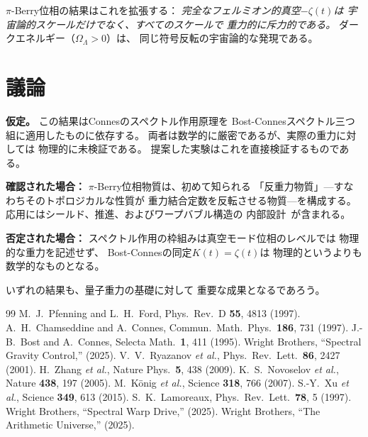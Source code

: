 \documentclass[11pt,a4paper,twocolumn]{article}
\begin{document}
$\pi$-Berry位相の結果はこれを拡張する：
\emph{完全なフェルミオン的真空$-\zeta(t)$は
宇宙論的スケールだけでなく、すべてのスケールで
重力的に斥力的である。}
ダークエネルギー（$\Omega_\Lambda > 0$）は、
同じ符号反転の宇宙論的な発現である。

\section{議論}

\textbf{仮定。}
この結果はConnesのスペクトル作用原理を
Bost-Connesスペクトル三つ組に適用したものに依存する。
両者は数学的に厳密であるが、実際の重力に対しては
物理的に未検証である。
提案した実験はこれを直接検証するものである。

\textbf{確認された場合：}
$\pi$-Berry位相物質は、初めて知られる
「反重力物質」---すなわちそのトポロジカルな性質が
重力結合定数を反転させる物質---を構成する。
応用にはシールド、推進、およびワープバブル構造の
内部設計~\cite{WB_spectral_warp}が含まれる。

\textbf{否定された場合：}
スペクトル作用の枠組みは真空モード位相のレベルでは
物理的な重力を記述せず、
Bost-Connesの同定$K(t) = \zeta(t)$は
物理的というよりも数学的なものとなる。

いずれの結果も、量子重力の基礎に対して
重要な成果となるであろう。

\begin{thebibliography}{99}
 M.~J.~Pfenning and L.~H.~Ford, Phys.\ Rev.\ D \textbf{55}, 4813 (1997).
 A.~H.~Chamseddine and A.~Connes, Commun.\ Math.\ Phys.\ \textbf{186}, 731 (1997).
 J.-B.~Bost and A.~Connes, Selecta Math.\ \textbf{1}, 411 (1995).
 Wright Brothers, ``Spectral Gravity Control,'' (2025).
 V.~V.~Ryazanov \textit{et al.}, Phys.\ Rev.\ Lett.\ \textbf{86}, 2427 (2001).
 H.~Zhang \textit{et al.}, Nature Phys.\ \textbf{5}, 438 (2009).
 K.~S.~Novoselov \textit{et al.}, Nature \textbf{438}, 197 (2005).
 M.~K\"onig \textit{et al.}, Science \textbf{318}, 766 (2007).
 S.-Y.~Xu \textit{et al.}, Science \textbf{349}, 613 (2015).
 S.~K.~Lamoreaux, Phys.\ Rev.\ Lett.\ \textbf{78}, 5 (1997).
 Wright Brothers, ``Spectral Warp Drive,'' (2025).
 Wright Brothers, ``The Arithmetic Universe,'' (2025).
\end{thebibliography}
\end{document}
